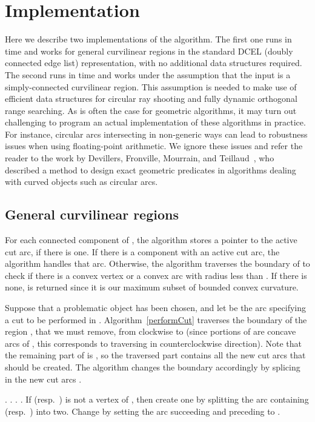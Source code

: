 \documentclass{article}
\begin{document}
\section{Implementation}\label{anImplementation}

Here we describe two implementations of the algorithm.
The first one runs in  time and works for general curvilinear regions in the standard DCEL (doubly connected edge list) representation, with no additional data structures required.
The second runs in  time and works under the assumption that the input  is a simply-connected curvilinear region.
This assumption is needed to make use of efficient data structures for circular ray shooting and fully dynamic orthogonal range searching.
As is often the case for geometric algorithms, it may turn out challenging to program an actual implementation of these algorithms in practice.
For instance, circular arcs intersecting in non-generic ways can lead to robustness issues when using floating-point arithmetic.
We ignore these issues and refer the reader to the work by Devillers, Fronville, Mourrain, and Teillaud~\cite{DEVILLERS2002119}, who described a method to design exact geometric predicates in algorithms dealing with curved objects such as circular arcs.

\subsection{General curvilinear regions}\label{anImplementation:general}

For each connected component of , the algorithm stores a pointer to the active cut arc, if there is one.
If there is a component with an active cut arc, the algorithm handles that arc.
Otherwise, the algorithm traverses the boundary of  to check if there is a convex vertex or a convex arc with radius less than .
If there is none,  is returned since it is our maximum subset of bounded convex curvature.

Suppose that a problematic object has been chosen, and let  be the arc specifying a cut to be performed in .
Algorithm~\ref{performCut} traverses the boundary of the region , that we must remove, from  clockwise to  (since portions of  are concave arcs of , this corresponds to traversing  in counterclockwise direction).
Note that the remaining part of  is , so the traversed part contains all the new cut arcs that should be created.
The algorithm changes the boundary  accordingly by splicing in the new cut arcs .

\begin{algorithm}[h]
\LinesNumbered
\DontPrintSemicolon
\SetArgSty{}
.\; \label{alg1:line1}
\Repeat {}
{
.\;
.\;
.\;
If  (resp.~) is not a vertex of , then create one by splitting the arc containing  (resp.~) into two. \;
Change  by setting the arc succeeding  and preceding  to .\;
}
\caption{}
\label{performCut}
\end{algorithm}
\end{document}
